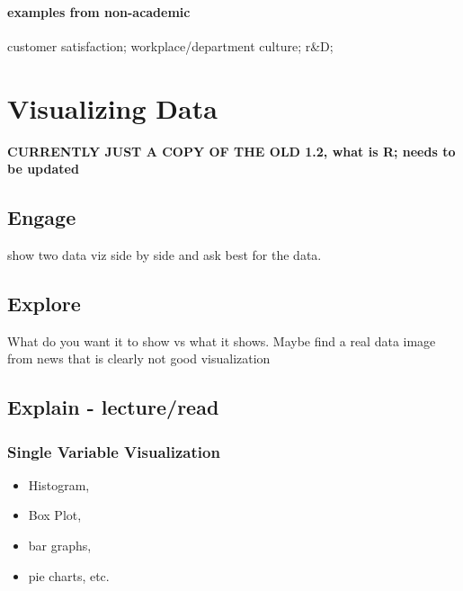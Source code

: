 \documentclass[
]{book}
\providecommand{\tightlist}{%
  \setlength{\itemsep}{0pt}\setlength{\parskip}{0pt}}
\begin{document}
\hypertarget{examples-from-non-academic}{%
\subsubsection{examples from non-academic}\label{examples-from-non-academic}}

customer satisfaction; workplace/department culture; r\&D;

\hypertarget{visualizing-data}{%
\chapter{Visualizing Data}\label{visualizing-data}}

\textbf{CURRENTLY JUST A COPY OF THE OLD 1.2, what is R; needs to be updated }

\hypertarget{engage-1}{%
\section{Engage}\label{engage-1}}

show two data viz side by side and ask best for the data.

\hypertarget{explore-1}{%
\section{Explore}\label{explore-1}}

What do you want it to show vs what it shows. Maybe find a real data image from news that is clearly not good visualization

\hypertarget{explain---lectureread}{%
\section{Explain - lecture/read}\label{explain---lectureread}}

\hypertarget{single-variable-visualization}{%
\subsection{Single Variable Visualization}\label{single-variable-visualization}}

\begin{itemize}
\tightlist
\item
  Histogram,
\item
  Box Plot,
\item
  bar graphs,
\item
  pie charts, etc.
\end{itemize}
\end{document}
